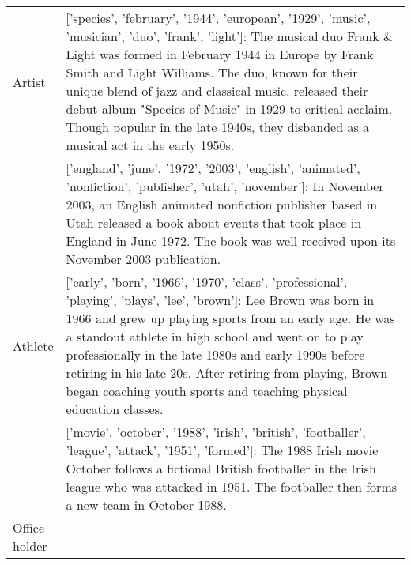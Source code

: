 \begin{table*}
{\begin{centering}
\begin{adjustwidth}{-0.5in}{-0.1in}
\begin{tabular}{p{0.08\linewidth}p{0.92\linewidth}}
Artist &

['species', 'february', '1944', 'european', '1929', 'music', 'musician', 'duo', 'frank', 'light']: \newline 
\textcolor{goodgreen}{The musical duo Frank \& Light was formed in February 1944 in Europe by Frank Smith and Light Williams. The duo, known for their unique blend of jazz and classical music, released their debut album "Species of Music" in 1929 to critical acclaim. Though popular in the late 1940s, they disbanded as a musical act in the early 1950s.} \\

& ['england', 'june', '1972', '2003', 'english', 'animated', 'nonfiction', 'publisher', 'utah', 'november']: \newline 
\textcolor{badred}{In November 2003, an English animated nonfiction publisher based in Utah released a book about events that took place in England in June 1972. The book was well-received upon its November 2003 publication. }\\

\midrule
 Athlete &

['early', 'born', '1966', '1970', 'class', 'professional', 'playing', 'plays', 'lee', 'brown']: \newline 
\textcolor{goodgreen}{Lee Brown was born in 1966 and grew up playing sports from an early age. He was a standout athlete in high school and went on to play professionally in the late 1980s and early 1990s before retiring in his late 20s. After retiring from playing, Brown began coaching youth sports and teaching physical education classes. } \\

&


['movie', 'october', '1988', 'irish', 'british', 'footballer', 'league', 'attack', '1951', 'formed']: \newline 
\textcolor{badred}{The 1988 Irish movie October follows a fictional British footballer in the Irish league who was attacked in 1951. The footballer then forms a new team in October 1988.} \\


\midrule
Office holder &


\end{tabular}
\end{adjustwidth}
\end{centering}}
\end{table*}
